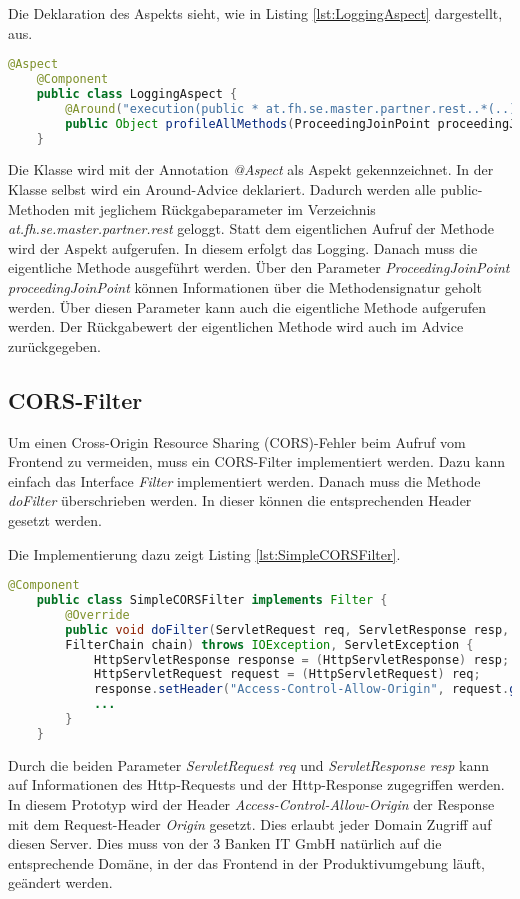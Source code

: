 Die Deklaration des Aspekts sieht, wie in Listing \ref{lst:LoggingAspect} dargestellt, aus.

\begin{lstlisting}[language=java, caption={LoggingAspect.java}, label=lst:LoggingAspect]
	@Aspect
	@Component
	public class LoggingAspect {
		@Around("execution(public * at.fh.se.master.partner.rest..*(..))")
		public Object profileAllMethods(ProceedingJoinPoint proceedingJoinPoint);
	}
\end{lstlisting}

Die Klasse wird mit der Annotation \textit{@Aspect} als Aspekt gekennzeichnet. In der Klasse selbst wird ein Around-Advice deklariert. Dadurch werden alle public-Methoden mit jeglichem Rückgabeparameter im Verzeichnis \textit{at.fh.se.master.partner.rest} geloggt. Statt dem eigentlichen Aufruf der Methode wird der Aspekt aufgerufen. In diesem erfolgt das Logging. Danach muss die eigentliche Methode ausgeführt werden. Über den Parameter \textit{ProceedingJoinPoint proceedingJoinPoint} können Informationen über die Methodensignatur geholt werden. Über diesen Parameter kann auch die eigentliche Methode aufgerufen werden. Der Rückgabewert der eigentlichen Methode wird auch im Advice zurückgegeben.

\subsection{CORS-Filter}
Um einen Cross-Origin Resource Sharing (CORS)-Fehler beim Aufruf vom Frontend zu vermeiden, muss ein CORS-Filter implementiert werden. Dazu kann einfach das Interface \textit{Filter} implementiert werden. Danach muss die Methode \textit{doFilter} überschrieben werden. In dieser können die entsprechenden Header gesetzt werden.

Die Implementierung dazu zeigt Listing \ref{lst:SimpleCORSFilter}.
\begin{lstlisting}[language=java, caption={SimpleCORSFilter.java}, label=lst:SimpleCORSFilter]
	@Component
	public class SimpleCORSFilter implements Filter {
		@Override
		public void doFilter(ServletRequest req, ServletResponse resp,
		FilterChain chain) throws IOException, ServletException {
			HttpServletResponse response = (HttpServletResponse) resp;
			HttpServletRequest request = (HttpServletRequest) req;
			response.setHeader("Access-Control-Allow-Origin", request.getHeader("Origin"));
			...
		}
	}
\end{lstlisting}

Durch die beiden Parameter \textit{ServletRequest req} und \textit{ServletResponse resp} kann auf Informationen des Http-Requests und der Http-Response zugegriffen werden.
In diesem Prototyp wird der Header \textit{Access-Control-Allow-Origin} der Response mit dem Request-Header \textit{Origin} gesetzt. Dies erlaubt jeder Domain Zugriff auf diesen Server. Dies muss von der 3 Banken IT GmbH natürlich auf die entsprechende Domäne, in der das Frontend in der Produktivumgebung läuft, geändert werden.

